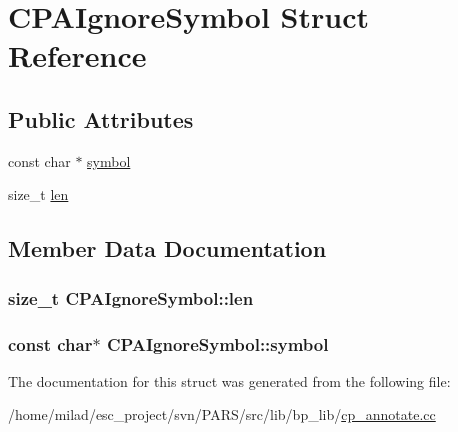 \hypertarget{structCPAIgnoreSymbol}{
\section{CPAIgnoreSymbol Struct Reference}
\label{structCPAIgnoreSymbol}
}
\subsection*{Public Attributes}
\begin{DoxyCompactItemize}
\item 
const char $\ast$ \hyperlink{structCPAIgnoreSymbol_a265879e6ec7f93a832c5fded66f1c073}{symbol}
\item 
size\_\-t \hyperlink{structCPAIgnoreSymbol_a06e56fe2b2f6f3344c2a941ad21e142d}{len}
\end{DoxyCompactItemize}


\subsection{Member Data Documentation}
\hypertarget{structCPAIgnoreSymbol_a06e56fe2b2f6f3344c2a941ad21e142d}{
\subsubsection[{len}]{\setlength{\rightskip}{0pt plus 5cm}size\_\-t {\bf CPAIgnoreSymbol::len}}}
\label{structCPAIgnoreSymbol_a06e56fe2b2f6f3344c2a941ad21e142d}
\hypertarget{structCPAIgnoreSymbol_a265879e6ec7f93a832c5fded66f1c073}{
\subsubsection[{symbol}]{\setlength{\rightskip}{0pt plus 5cm}const char$\ast$ {\bf CPAIgnoreSymbol::symbol}}}
\label{structCPAIgnoreSymbol_a265879e6ec7f93a832c5fded66f1c073}


The documentation for this struct was generated from the following file:\begin{DoxyCompactItemize}
\item 
/home/milad/esc\_\-project/svn/PARS/src/lib/bp\_\-lib/\hyperlink{cp__annotate_8cc}{cp\_\-annotate.cc}\end{DoxyCompactItemize}
